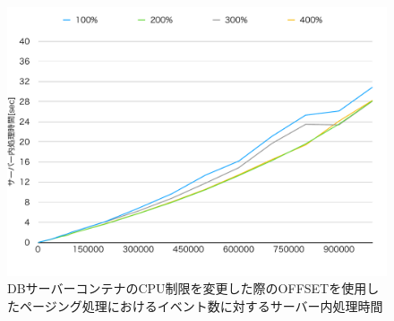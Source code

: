 \documentclass[../../../../../main]{subfiles}
\begin{document}
    \begin{figure}[H]
        \centering
        \includegraphics[width=12cm]{graph}
        \caption{DBサーバーコンテナのCPU制限を変更した際のOFFSETを使用したページング処理におけるイベント数に対するサーバー内処理時間}
        \label{fig:paging-offset-change-db-cpu-limit-server-time-app_4_8192-db_1024}
    \end{figure}
\end{document}

